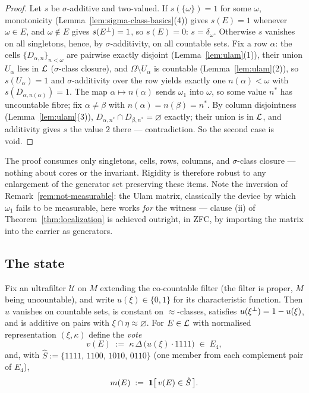 \begin{proof}
Let $s$ be $\sigma$-additive and two-valued. If $s(\{\omega\})=1$ for some
$\omega$, monotonicity (Lemma~\ref{lem:sigma-class-basics}(4)) gives $s(E)=1$
whenever $\omega\in E$, and $\omega\notin E$ gives $s(E{}^{\perp})=1$, so $s(E)=0$:
$s=\delta_\omega$. Otherwise $s$ vanishes on all singletons, hence, by
$\sigma$-additivity, on all countable sets. Fix a row $\alpha$: the cells
$\{D_{\alpha,n}\}_{n<\omega}$ are pairwise exactly disjoint
(Lemma~\ref{lem:ulam}(1)), their union $U_\alpha$ lies in $\mathcal{L}$ ($\sigma$-class
closure), and $\Omega\setminus U_\alpha$ is countable (Lemma~\ref{lem:ulam}(2)),
so $s(U_\alpha)=1$ and $\sigma$-additivity over the row yields exactly one
$n(\alpha)<\omega$ with $s(D_{\alpha,n(\alpha)})=1$. The map
$\alpha\mapsto n(\alpha)$ sends $\omega_1$ into $\omega$, so some value $n^\ast$
has uncountable fibre; fix $\alpha\neq\beta$ with $n(\alpha)=n(\beta)=n^\ast$.
By column disjointness (Lemma~\ref{lem:ulam}(3)),
$D_{\alpha,n^\ast}\cap D_{\beta,n^\ast}=\varnothing$ exactly; their union is in
$\mathcal{L}$, and additivity gives $s$ the value $2$ there --- contradiction. So the
second case is void.
\end{proof}

The proof consumes only singletons, cells, rows, columns, and $\sigma$-class
closure --- nothing about cores or the invariant. Rigidity is therefore robust to
any enlargement of the generator set preserving these items. Note the inversion
of Remark~\ref{rem:not-measurable}: the Ulam matrix, classically the device by
which $\omega_1$ fails to be measurable, here works \emph{for} the witness ---
clause (ii) of Theorem~\ref{thm:localization} is achieved outright, in ZFC, by
importing the matrix into the carrier as generators.

\subsection{The state}\label{subsec:state}

\begin{definition}\label{def:state}
Fix an ultrafilter $\mathcal U$ on $M$ extending the co-countable filter (the
filter is proper, $M$ being uncountable), and write $u(\xi)\in\{0,1\}$ for its
characteristic function. Then $u$ vanishes on countable sets, is constant on
$\approx$-classes, satisfies $u(\xi{}^{\perp})=1-u(\xi)$, and is additive on pairs
with $\xi\cap\eta\approx\varnothing$. For $E\in\mathcal{L}$ with normalised
representation $(\xi,\kappa)$ define the \emph{vote}
\[
  v(E) \;:=\; \kappa\,\Delta\,\bigl(u(\xi)\cdot 1111\bigr)\;\in\;E_4,
\]
and, with $\hat S := \{1111,\,1100,\,1010,\,0110\}$ (one member from each
complement pair of $E_4$),
\[
  m(E) \;:=\; \mathbf{1}\bigl[\,v(E)\in\hat S\,\bigr].
\]
\end{definition}

